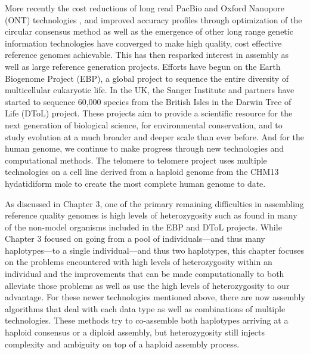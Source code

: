 \par{
More recently the cost reductions of long read PacBio and Oxford Nanopore (ONT) technologies\cite{pacbio} \cite{oxford}, and improved accuracy profiles through optimization of the circular consensus method\cite{ccs}\cite{HIFI}
as well as the emergence of other long range genetic information technologies\cite{10xlinked}\cite{HiC}\cite{bionano} 
have converged to make high quality, cost effective reference genomes achievable. This has then resparked interest in assembly 
as well as large reference generation projects. Efforts have begun on the Earth Biogenome Project (EBP)\cite{EBGP}, a global project to sequence the entire diversity of multicellular eukaryotic life. In the UK, the Sanger Institute and partners have started to sequence 60,000 species from the British Isles in the Darwin Tree of Life (DToL) project. These projects aim to provide a scientific resource for the next generation of biological science, for environmental conservation, and to study evolution at a much broader and deeper scale than ever before. And for the human genome, we continue to make progress through new technologies and computational methods\cite{Wenger2019}\cite{tobias1}\cite{eichler1}. The telomere to telomere project uses multiple technologies on a cell line derived from a haploid genome from the CHM13 hydatidiform mole to create the most complete human genome to date\cite{T2T2}\cite{T2T1}.
} 

\par{
As discussed in Chapter 3, one of the primary remaining difficulties in assembling reference quality genomes is high levels of heterozygosity such as found in many of the non-model organisms included in the EBP and DToL projects. While Chapter 3 focused on going from a pool of individuals---and thus many haplotypes---to a single individual---and thus two haplotypes, this chapter focuses on the problems encountered with high levels of heterozygosity within an individual and the improvements that can be made computationally to both alleviate those problems as well as use the high levels of heterozygosity to our advantage. 
For these newer technologies mentioned above, there are now assembly algorithms that deal with each data type\cite{falcon}\cite{supernova}\cite{bionano_assembly} 
as well as combinations of multiple technologies\cite{genemyers}\cite{hybrid10x}\cite{hicscafffirst}\cite{hicassembly}. 
 These methods try to co-assemble both haplotypes arriving at a haploid consensus \cite{watchtower} \cite{canu} 
 or a diploid assembly\cite{falconphase}\cite{supernova}\cite{hifiasm}\cite{dipasm}, but heterozygosity still injects complexity and ambiguity on top of a haploid assembly process.
} 

